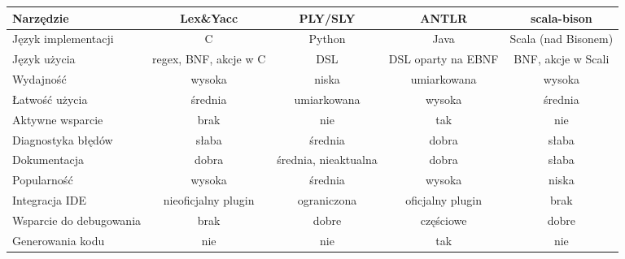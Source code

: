 \begin{table}[ht]
    \centering
    \begin{tabular}{L|CCCC}
        \toprule
        \large{Narzędzie}       & \textbf{Lex\&Yacc}                        & \textbf{PLY/SLY}     & \textbf{ANTLR}     & \textbf{scala-bison} \\
        \midrule
        Język implementacji     & C                                         & Python               & Java               & Scala (nad Bisonem)  \\
        \hline
        Język użycia            & regex, BNF, akcje w C                     & DSL                  & DSL oparty na EBNF & BNF, akcje w Scali   \\
        \hline
        Wydajność               & wysoka                                    & niska                & umiarkowana        & wysoka               \\
        \hline
        Łatwość użycia          & średnia                                   & umiarkowana          & wysoka             & średnia              \\
        \hline
        Aktywne wsparcie        & brak                                      & nie                  & tak                & nie                  \\
        \hline
        Diagnostyka błędów      & słaba                                     & średnia              & dobra              & słaba                \\
        \hline
        Dokumentacja            & dobra                                     & średnia, nieaktualna & dobra              & słaba                \\
        \hline
        Popularność             & wysoka                                    & średnia              & wysoka             & niska                \\
        \hline
        Integracja IDE          & nieoficjalny plugin                       & ograniczona          & oficjalny plugin   & brak                 \\
        \hline
        Wsparcie do debugowania & brak                                      & dobre                & częściowe          & dobre                \\
        \hline
        Generowania kodu        & nie                                       & nie                  & tak                & nie                  \\
        \hline

\end{tabular}
\end{table}
